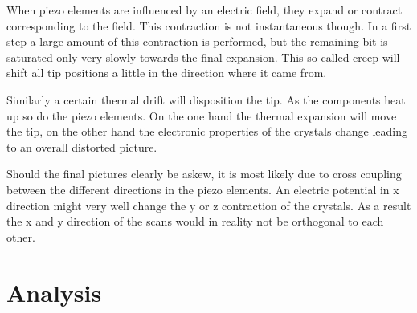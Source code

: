 \documentclass[a4paper]{scrartcl}
\numberwithin{equation}{section}
\numberwithin{figure}{section}
\numberwithin{table}{section}
\begin{document}
When piezo elements are influenced by an electric field, they expand or contract corresponding to the field. This contraction is not instantaneous though. In a first step a large amount of this contraction is performed, but the remaining bit is saturated only very slowly towards the final expansion. This so called creep will shift all tip positions a little in the direction where it came from.

Similarly a certain thermal drift will disposition the tip. As the components heat up so do the piezo elements. On the one hand the thermal expansion will move the tip, on the other hand the electronic properties of the crystals change leading to an overall distorted picture.

Should the final pictures clearly be askew, it is most likely due to cross coupling between the different directions in the piezo elements. An electric potential in x direction might very well change the y or z contraction of the crystals. As a result the x and y direction of the scans would in reality not be orthogonal to each other.



\clearpage
\section{Analysis}
\end{document}
